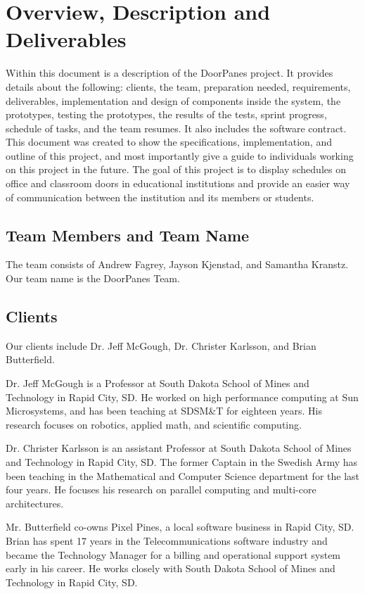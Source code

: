 

\chapter{Overview, Description and Deliverables}

Within this document is a description of the DoorPanes project. It provides details about the following: clients, the team, preparation needed, requirements, deliverables, implementation and design of components inside the system, the prototypes, testing the prototypes, the results of the tests, sprint progress, schedule of tasks, and the team resumes. It also includes the software contract. This document was created to show the specifications, implementation, and  outline of this project, and most importantly give a guide to individuals working on this project in the future. The goal of this project is to display schedules on office and classroom doors in educational institutions and provide an easier way of communication between the institution and its members or students. 
 

\section{Team Members and Team Name}
The team consists of Andrew Fagrey, Jayson Kjenstad, and Samantha Kranstz. Our team name is the DoorPanes Team.



\section{Clients}
Our clients include Dr. Jeff McGough, Dr. Christer Karlsson, and Brian Butterfield. 

Dr. Jeff McGough is a Professor at South Dakota School of Mines and Technology in Rapid City, SD. He worked on high performance computing at Sun Microsystems, and has been teaching at SDSM\&T for eighteen years. His research focuses on robotics, applied math, and scientific computing.

Dr. Christer Karlsson is an assistant Professor at South Dakota School of Mines and Technology in Rapid City, SD. The former Captain in the Swedish Army has been teaching in the Mathematical and Computer Science department for the last four years. He focuses his research on parallel computing and multi-core architectures. 

Mr. Butterfield co-owns Pixel Pines, a local software business in Rapid City, SD. Brian has spent 17 years in the Telecommunications software industry and became the Technology Manager for a billing and operational support system early in his career. He works closely with South Dakota School of Mines and Technology in Rapid City, SD.

